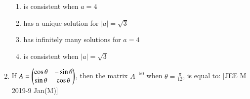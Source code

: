 \documentclass[journal,,12pt,onecolumn]{IEEEtran}
\theoremstyle{remark}
\begin{document}
\begin{enumerate}
\begin{enumerate}
    

    \item is consistent when $a=4$
    \item has a unique solution for $|a|= \sqrt{3}$
    \item has infinitely many solutions for $a=4$
    \item is consistent when $|a|= \sqrt{3}$
    
\end{enumerate}
\item If $A= \begin{pmatrix}
    \cos{\theta} & -\sin{\theta} \\
    \sin{\theta} & \cos{\theta}
\end{pmatrix}$, then the matrix $A^{-50}$ when $\theta=\frac{\pi}{12}$, is equal to: 
\hfill{[JEE M 2019-9 Jan(M)]}
\begin{enumerate}
\end{enumerate}
\end{enumerate}
\end{document}

